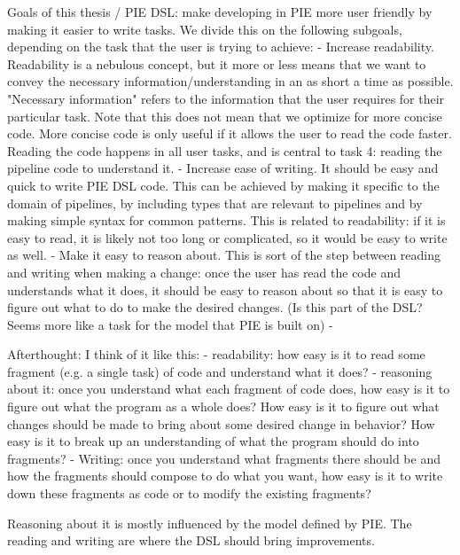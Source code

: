 Goals of this thesis / PIE DSL: make developing in PIE more user friendly by making it easier to write tasks.
We divide this on the following subgoals, depending on the task that the user is trying to achieve:
- Increase readability. Readability is a nebulous concept, but it more or less means that we want to convey the necessary information/understanding in an as short a time as possible. "Necessary information" refers to the information that the user requires for their particular task.
Note that this does not mean that we optimize for more concise code. More concise code is only useful if it allows the user to read the code faster.
Reading the code happens in all user tasks, and is central to task 4: reading the pipeline code to understand it.
- Increase ease of writing. It should be easy and quick to write PIE DSL code.
This can be achieved by making it specific to the domain of pipelines, by including types that are relevant to pipelines and by making simple syntax for common patterns.
This is related to readability: if it is easy to read, it is likely not too long or complicated, so it would be easy to write as well.
- Make it easy to reason about. This is sort of the step between reading and writing when making a change: once the user has read the code and understands what it does, it should be easy to reason about so that it is easy to figure out what to do to make the desired changes. (Is this part of the DSL? Seems more like a task for the model that PIE is built on)
- 


Afterthought: I think of it like this:
- readability: how easy is it to read some fragment (e.g. a single task) of code and understand what it does?
- reasoning about it: once you understand what each fragment of code does, how easy is it to figure out what the program as a whole does? How easy is it to figure out what changes should be made to bring about some desired change in behavior? How easy is it to break up an understanding of what the program should do into fragments?
- Writing: once you understand what fragments there should be and how the fragments should compose to do what you want, how easy is it to write down these fragments as code or to modify the existing fragments?

Reasoning about it is mostly influenced by the model defined by PIE.
The reading and writing are where the DSL should bring improvements.


